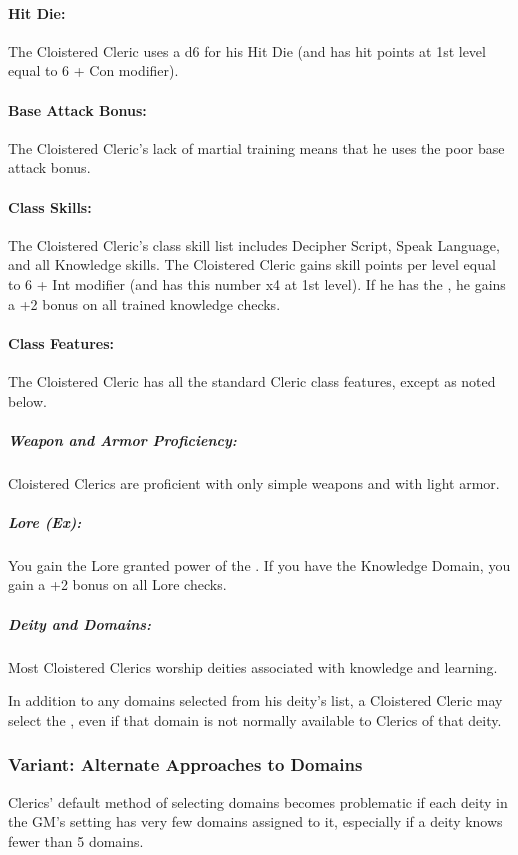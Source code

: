 \paragraph{Hit Die:}
The Cloistered Cleric uses a d6 for his Hit Die (and has hit points at 1st level equal to 6 + Con modifier).

\paragraph{Base Attack Bonus:}
The Cloistered Cleric's lack of martial training means that he uses the poor base attack bonus.

\paragraph{Class Skills:}
The Cloistered Cleric's class skill list includes Decipher Script, Speak Language, and all Knowledge skills. The Cloistered Cleric gains skill points per level equal to 6 + Int modifier (and has this number x4 at 1st level). If he has the , he gains a +2 bonus on all trained knowledge checks.

\paragraph{Class Features:}
The Cloistered Cleric has all the standard Cleric class features, except as noted below.

\subparagraph{Weapon and Armor Proficiency:}
Cloistered Clerics are proficient with only simple weapons and with light armor.

\subparagraph{Lore (Ex):}
You gain the Lore granted power of the .
If you have the Knowledge Domain, you gain a +2 bonus on all Lore checks.

\subparagraph{Deity and Domains:}
Most Cloistered Clerics worship deities associated with knowledge and learning.

In addition to any domains selected from his deity's list, a Cloistered Cleric may select the , even if that  domain is not normally available to Clerics of that deity.
\subsubsection{Variant: Alternate Approaches to Domains}
Clerics' default method of selecting domains becomes problematic if each deity in the GM's setting has very few domains assigned to it, especially if a deity knows fewer than 5 domains.

